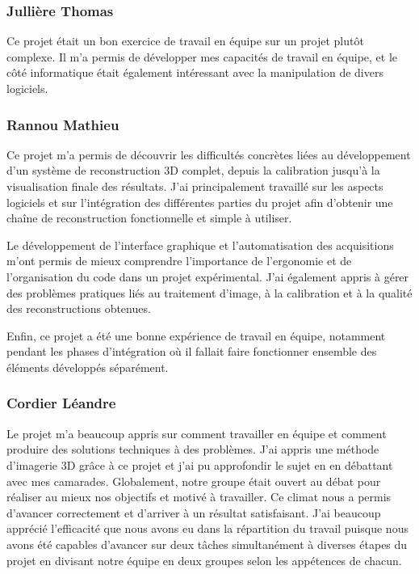 \documentclass[10pt]{article} %
\begin{document}
\subsubsection*{Jullière Thomas}
Ce projet était un bon exercice de travail en équipe sur un projet plutôt complexe. Il m'a permis de développer mes capacités de travail en équipe, et le côté informatique était également intéressant avec la manipulation de divers logiciels. 

\subsubsection*{Rannou Mathieu}
Ce projet m’a permis de découvrir les difficultés concrètes liées au développement d’un système de reconstruction 3D complet, depuis la calibration jusqu’à la visualisation finale des résultats. J’ai principalement travaillé sur les aspects logiciels et sur l’intégration des différentes parties du projet afin d’obtenir une chaîne de reconstruction fonctionnelle et simple à utiliser.

Le développement de l’interface graphique et l’automatisation des acquisitions m’ont permis de mieux comprendre l’importance de l’ergonomie et de l’organisation du code dans un projet expérimental. J’ai également appris à gérer des problèmes pratiques liés au traitement d’image, à la calibration et à la qualité des reconstructions obtenues.

Enfin, ce projet a été une bonne expérience de travail en équipe, notamment pendant les phases d’intégration où il fallait faire fonctionner ensemble des éléments développés séparément.

\subsubsection*{Cordier Léandre}
Le projet m'a beaucoup appris sur comment travailler en équipe et comment produire des solutions techniques à des problèmes. J'ai appris une méthode d'imagerie 3D grâce à ce projet et j'ai pu approfondir le sujet en en débattant avec mes camarades. Globalement, notre groupe était ouvert au débat pour réaliser au mieux nos objectifs et motivé à travailler. Ce climat nous a permis d'avancer correctement et d'arriver à un résultat satisfaisant. J'ai beaucoup apprécié l'efficacité que nous avons eu dans la répartition du travail puisque nous avons été capables d'avancer sur deux tâches simultanément à diverses étapes du projet en divisant notre équipe en deux groupes selon les appétences de chacun.
\\
\end{document}
